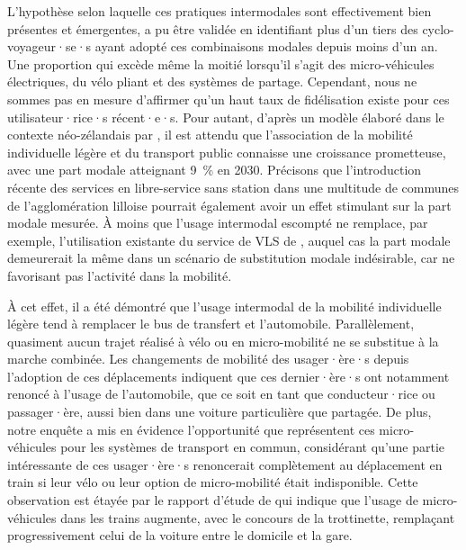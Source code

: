\begin{refsegment}
L'hypothèse selon laquelle ces pratiques intermodales sont effectivement bien présentes et émergentes, a pu être validée en identifiant plus d'un tiers des cyclo-voyageur·se·s ayant adopté ces combinaisons modales depuis moins d'un an. Une proportion qui excède même la moitié lorsqu'il s'agit des \gls{micro-véhicules} électriques, du vélo pliant et des systèmes de partage. Cependant, nous ne sommes pas en mesure d'affirmer qu'un haut taux de fidélisation existe pour ces utilisateur·rice·s récent·e·s. Pour autant, d'après un modèle élaboré dans le contexte néo-zélandais par \textcolor{blue}{\textcite[]{ensor_mode_2021}}, il est attendu que l'association de la mobilité individuelle légère et du transport public connaisse une croissance prometteuse, avec une part modale atteignant 9~\% en 2030. Précisons que l'introduction récente des services en libre-service sans station dans une multitude de communes de l'agglomération lilloise pourrait également avoir un effet stimulant sur la part modale mesurée. À moins que l'usage intermodal escompté ne remplace, par exemple, l'utilisation existante du service de \acrshort{VLS} de , auquel cas la part modale demeurerait la même dans un scénario de substitution modale indésirable, car ne favorisant pas l'activité dans la mobilité.%

À cet effet, il a été démontré que l'usage intermodal de la mobilité individuelle légère tend à remplacer le bus de transfert et l'automobile. Parallèlement, quasiment aucun trajet réalisé à vélo ou en micro-mobilité ne se substitue à la marche combinée. Les changements de mobilité des usager·ère·s depuis l'adoption de ces déplacements indiquent que ces dernier·ère·s ont notamment renoncé à l'usage de l'automobile, que ce soit en tant que conducteur·rice ou passager·ère, aussi bien dans une voiture particulière que partagée. De plus, notre enquête a mis en évidence l'opportunité que représentent ces micro-véhicules pour les systèmes de transport en commun, considérant qu'une partie intéressante de ces usager·ère·s renoncerait complètement au déplacement en train si leur vélo ou leur option de micro-mobilité était indisponible. Cette observation est étayée par le rapport d'étude de \textcolor{blue}{\textcite[]{enov_enquete_2021}} qui indique que l'usage de micro-véhicules dans les trains augmente, avec le concours de la trottinette, remplaçant progressivement celui de la voiture entre le domicile et la gare.%


\end{refsegment}
